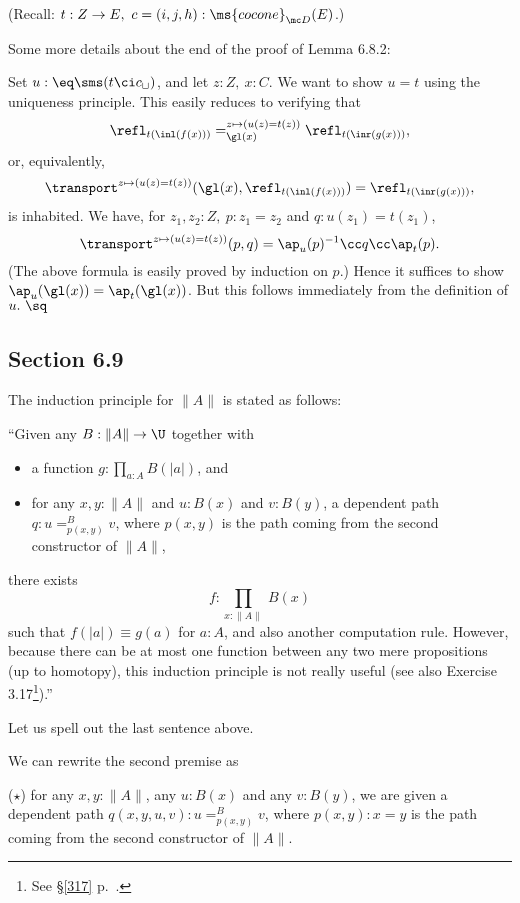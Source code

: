 \documentclass[12pt]{article}
\begin{document}
\nn(Recall: $t:Z\to E,\ c=(i,j,h):\ms{cocone}_{\mc D}(E)$.)

Some more details about the end of the proof of Lemma 6.8.2:

Set $u:\eq\sms(t\ci c_\sqcup)$, and let $z:Z,\ x:C$. We want to show $u=t$ using the uniqueness principle. This easily reduces to verifying that 
$$
\refl_{t(\inl(f(x)))}=_{\gl(x)}^{z\mapsto(u(z)=t(z))}\refl_{t(\inr(g(x)))},
$$ 
or, equivalently, 
$$
\transport^{z\mapsto(u(z)=t(z))}(\gl(x),\refl_{t(\inl(f(x)))})=\refl_{t(\inr(g(x)))},
$$ 
is inhabited. We have, for $z_1,z_2:Z,\ p:z_1=z_2$ and $q:u(z_1)=t(z_1)$, 
$$
\transport^{z\mapsto(u(z)=t(z))}(p,q)=\ap_u(p)^{-1}\cc q\cc\ap_t(p).
$$ 
(The above formula is easily proved by induction on $p$.) Hence it suffices to show $\ap_u(\gl(x))=\ap_t(\gl(x))$. But this follows immediately from the definition of $u.\ \sq$


\subsection{Section 6.9}\label{69}

The induction principle for $\lVert A\rVert$ is stated as follows:

\nn``Given any $B:\lVert A\rVert\to\U$ together with
\begin{itemize}
\item a function $g:\prod_{a:A}B(\lvert a\rvert)$, and
\item for any $x,y:\lVert A\rVert$ and $u:B(x)$ and $v:B(y)$, a dependent path $q:u=^B_{p(x,y)}v$, where $p(x,y)$ is the path coming from the second constructor of $\lVert A\rVert$,
\end{itemize}
there exists 
$$
f:\prod_{x:\lVert A\rVert}\ B(x)
$$ 
such that $f(\lvert a\rvert)\equiv g(a)$ for $a:A$, and also another computation rule. However, because there can be at most one function between any two mere propositions (up to homotopy), this induction principle is not really useful (see also Exercise 3.17\footnote{See \S\ref{317} p.~\pageref{317}.}).''

Let us spell out the last sentence above.

We can rewrite the second premise as

\nn($\star$) for any $x,y:\lVert A\rVert$, any $u:B(x)$ and any $v:B(y)$, we are given a dependent path $q(x,y,u,v):u=^B_{p(x,y)}v$, where $p(x,y):x=y$ is the path coming from the second constructor of $\lVert A\rVert$.
\end{document}
